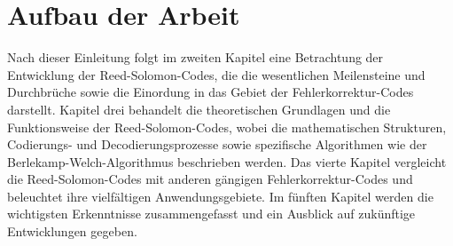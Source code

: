\section{Aufbau der Arbeit}\label{sec:stucture}

Nach dieser Einleitung folgt im zweiten Kapitel eine Betrachtung der Entwicklung der Reed-Solomon-Codes, die die wesentlichen Meilensteine und Durchbrüche sowie die Einordung in das Gebiet der Fehlerkorrektur-Codes darstellt. 
Kapitel drei behandelt die theoretischen Grundlagen und die Funktionsweise der Reed-Solomon-Codes, wobei die mathematischen Strukturen, Codierungs- und Decodierungsprozesse sowie spezifische Algorithmen wie der Berlekamp-Welch-Algorithmus beschrieben werden. 
Das vierte Kapitel vergleicht die Reed-Solomon-Codes mit anderen gängigen Fehlerkorrektur-Codes und beleuchtet ihre vielfältigen Anwendungsgebiete. 
Im fünften Kapitel werden die wichtigsten Erkenntnisse zusammengefasst und ein Ausblick auf zukünftige Entwicklungen gegeben.
